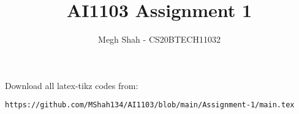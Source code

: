 \documentclass[journal,12pt,twocolumn]{IEEEtran}
\DeclareMathOperator*{\Res}{Res}
\begin{document}
\newcommand{\BEQA}{\begin{eqnarray}}
\newcommand{\EEQA}{\end{eqnarray}}
\newcommand{\define}{\stackrel{\triangle}{=}}

\raggedbottom
\setlength{\parindent}{0pt}
\providecommand{\mbf}{\mathbf}
\providecommand{\pr}[1]{\ensuremath{\Pr\left(#1\right)}}
\providecommand{\qfunc}[1]{\ensuremath{Q\left(#1\right)}}
\providecommand{\sbrak}[1]{\ensuremath{{}\left[#1\right]}}
\providecommand{\lsbrak}[1]{\ensuremath{{}\left[#1\right.}}
\providecommand{\rsbrak}[1]{\ensuremath{{}\left.#1\right]}}
\providecommand{\brak}[1]{\ensuremath{\left(#1\right)}}
\providecommand{\lbrak}[1]{\ensuremath{\left(#1\right.}}
\providecommand{\rbrak}[1]{\ensuremath{\left.#1\right)}}
\providecommand{\cbrak}[1]{\ensuremath{\left\{#1\right\}}}
\providecommand{\lcbrak}[1]{\ensuremath{\left\{#1\right.}}
\providecommand{\rcbrak}[1]{\ensuremath{\left.#1\right\}}}
\theoremstyle{remark}
\newtheorem{rem}{Remark}
\newcommand{\sgn}{\mathop{\mathrm{sgn}}}
\providecommand{\abs}[1]{\vert#1\vert}
\providecommand{\res}[1]{\Res\displaylimits_{#1}} 
\providecommand{\norm}[1]{\lVert#1\rVert}
\providecommand{\mtx}[1]{\mathbf{#1}}
\providecommand{\mean}[1]{E[ #1 ]}
\providecommand{\fourier}{\overset{\mathcal{F}}{ \rightleftharpoons}}
\providecommand{\system}{\overset{\mathcal{H}}{ \longleftrightarrow}}
\newcommand{\solution}{\noindent \textbf{Solution: }}
\newcommand{\cosec}{\,\text{cosec}\,}
\providecommand{\dec}[2]{\ensuremath{\overset{#1}{\underset{#2}{\gtrless}}}}
\newcommand{\myvec}[1]{\ensuremath{\begin{pmatrix}#1\end{pmatrix}}}
\newcommand{\mydet}[1]{\ensuremath{\begin{vmatrix}#1\end{vmatrix}}}
\makeatletter
{}
\makeatother
\let\StandardTheFigure\thefigure
\let\vec\mathbf
\renewcommand{\thefigure}{\theproblem}
\def\putbox#1#2#3{\makebox[0in][l]{\makebox[#1][l]{}\raisebox{\baselineskip}[0in][0in]{\raisebox{#2}[0in][0in]{#3}}}}
     \def\rightbox#1{\makebox[0in][r]{#1}}
     \def\centbox#1{\makebox[0in]{#1}}
     \def\topbox#1{\raisebox{-\baselineskip}[0in][0in]{#1}}
     \def\midbox#1{\raisebox{-0.5\baselineskip}[0in][0in]{#1}}
\vspace{3cm}
\title{AI1103 Assignment 1}
\author{Megh Shah - CS20BTECH11032}
\maketitle
\newpage
\bigskip
\renewcommand{\thefigure}{\theenumi}
\renewcommand{\thetable}{\theenumi}
Download all latex-tikz codes from: 
\begin{lstlisting}
https://github.com/MShah134/AI1103/blob/main/Assignment-1/main.tex
\end{lstlisting}
\end{document}
